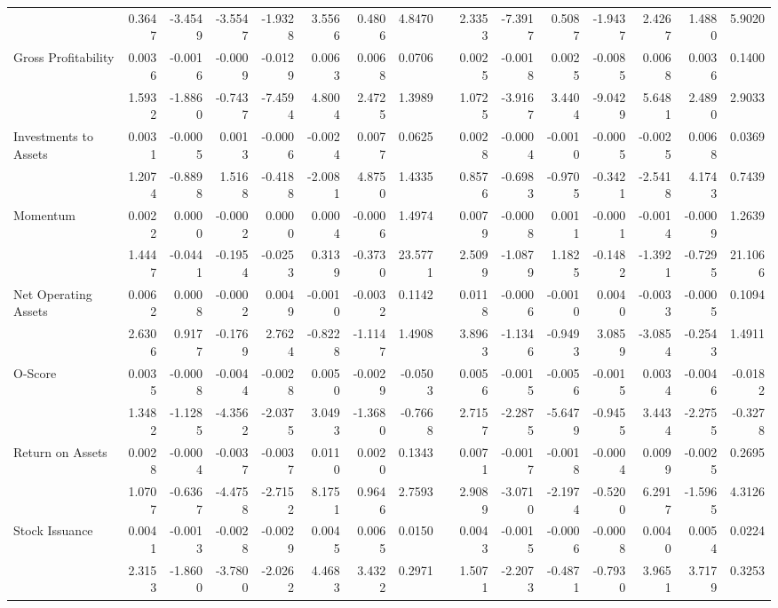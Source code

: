 \begin{table}[h]
{\begin{tabular}{lrrrrrrrrrrrrrrr}
            & 0.3647 & -3.4549 & -3.5547 & -1.9328 & 3.5566 & 0.4806 & 4.8470 &       & 2.3353 & -7.3917 & 0.5087 & -1.9437 & 2.4267 & 1.4880 & 5.9020 \\
      Gross Profitability & 0.0036 & -0.0016 & -0.0009 & -0.0129 & 0.0063 & 0.0068 & 0.0706 &       & 0.0025 & -0.0018 & 0.0025 & -0.0085 & 0.0068 & 0.0036 & 0.1400 \\
            & 1.5932 & -1.8860 & -0.7437 & -7.4594 & 4.8004 & 2.4725 & 1.3989 &       & 1.0725 & -3.9167 & 3.4404 & -9.0429 & 5.6481 & 2.4890 & 2.9033 \\
      Investments to Assets & 0.0031 & -0.0005 & 0.0013 & -0.0006 & -0.0024 & 0.0077 & 0.0625 &       & 0.0028 & -0.0004 & -0.0010 & -0.0005 & -0.0025 & 0.0068 & 0.0369 \\
            & 1.2074 & -0.8898 & 1.5168 & -0.4188 & -2.0081 & 4.8750 & 1.4335 &       & 0.8576 & -0.6983 & -0.9705 & -0.3421 & -2.5418 & 4.1743 & 0.7439 \\
      Momentum & 0.0022 & 0.0000 & -0.0002 & 0.0000 & 0.0004 & -0.0006 & 1.4974 &       & 0.0079 & -0.0008 & 0.0011 & -0.0001 & -0.0014 & -0.0009 & 1.2639 \\
            & 1.4447 & -0.0441 & -0.1954 & -0.0253 & 0.3139 & -0.3730 & 23.5771 &       & 2.5099 & -1.0879 & 1.1825 & -0.1482 & -1.3921 & -0.7295 & 21.1066 \\
      Net Operating Assets & 0.0062 & 0.0008 & -0.0002 & 0.0049 & -0.0010 & -0.0032 & 0.1142 &       & 0.0118 & -0.0006 & -0.0010 & 0.0040 & -0.0033 & -0.0005 & 0.1094 \\
            & 2.6306 & 0.9177 & -0.1769 & 2.7624 & -0.8228 & -1.1147 & 1.4908 &       & 3.8963 & -1.1346 & -0.9493 & 3.0859 & -3.0854 & -0.2543 & 1.4911 \\
      O-Score & 0.0035 & -0.0008 & -0.0044 & -0.0028 & 0.0050 & -0.0029 & -0.0503 &       & 0.0056 & -0.0015 & -0.0056 & -0.0015 & 0.0034 & -0.0046 & -0.0182 \\
            & 1.3482 & -1.1285 & -4.3562 & -2.0375 & 3.0493 & -1.3680 & -0.7668 &       & 2.7157 & -2.2875 & -5.6479 & -0.9455 & 3.4434 & -2.2755 & -0.3278 \\
      Return on Assets & 0.0028 & -0.0004 & -0.0037 & -0.0037 & 0.0110 & 0.0020 & 0.1343 &       & 0.0071 & -0.0017 & -0.0018 & -0.0004 & 0.0099 & -0.0025 & 0.2695 \\
            & 1.0707 & -0.6367 & -4.4758 & -2.7152 & 8.1751 & 0.9646 & 2.7593 &       & 2.9089 & -3.0710 & -2.1974 & -0.5200 & 6.2917 & -1.5965 & 4.3126 \\
      Stock Issuance & 0.0041 & -0.0013 & -0.0028 & -0.0029 & 0.0045 & 0.0065 & 0.0150 &       & 0.0043 & -0.0015 & -0.0006 & -0.0008 & 0.0040 & 0.0054 & 0.0224 \\
            & 2.3153 & -1.8600 & -3.7800 & -2.0262 & 4.4683 & 3.4322 & 0.2971 &       & 1.5071 & -2.2073 & -0.4871 & -0.7930 & 3.9651 & 3.7179 & 0.3253 \\
      \bottomrule
      \end{tabular}%
    }
    \label{tab:liq-ff6}%
  \end{table}%

